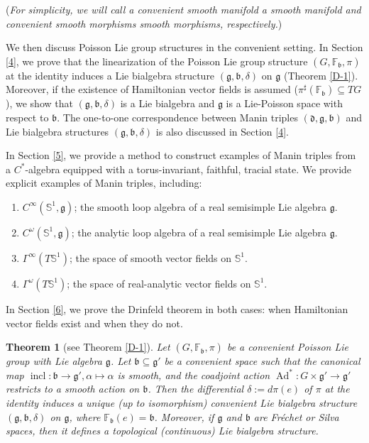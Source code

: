 \documentclass[11pt,reqno]{amsart}
\newtheorem{theorem}{Theorem}[section]
\theoremstyle{definition}
\numberwithin{equation}{section}
\begin{document}
(\textit{For simplicity, we will call a convenient smooth manifold a smooth manifold and convenient smooth morphisms smooth morphisms, respectively.})

We then discuss Poisson Lie group structures in the convenient setting. In Section \ref{4}, we prove that the linearization of the Poisson Lie group structure $(G, \mathbb{F}_{\mathfrak{b}}, \pi)$ at the identity induces a Lie bialgebra structure $(\mathfrak{g}, \mathfrak{b}, \delta)$ on $\mathfrak{g}$ (Theorem \ref{D-1}). Moreover, if the existence of Hamiltonian vector fields is assumed ($\pi^{\sharp}(\mathbb{F}_{\mathfrak{b}}) \subseteq TG$), we show that $(\mathfrak{g}, \mathfrak{b}, \delta)$ is a Lie bialgebra and $\mathfrak{g}$ is a Lie-Poisson space with respect to $\mathfrak{b}$. The one-to-one correspondence between Manin triples $(\mathfrak{d}, \mathfrak{g}, \mathfrak{b})$ and Lie bialgebra structures $(\mathfrak{g}, \mathfrak{b}, \delta)$ is also discussed in Section \ref{4}. 

In Section \ref{5}, we provide a method to construct examples of Manin triples from a $C^{*}$-algebra equipped with a torus-invariant, faithful, tracial state. We provide explicit examples of Manin triples, including:
\begin{enumerate}
    \item $C^{\infty}(\mathbb{S}^{1}, \mathfrak{g})$; the smooth loop algebra of a real semisimple Lie algebra $\mathfrak{g}$.
    \item $C^{\omega}(\mathbb{S}^{1}, \mathfrak{g})$; the analytic loop algebra of a real semisimple Lie algebra $\mathfrak{g}$.
    \item $\Gamma^{\infty}(T\mathbb{S}^{1})$; the space of smooth vector fields on $\mathbb{S}^{1}$.
    \item $\Gamma^{\omega}(T\mathbb{S}^{1})$; the space of real-analytic vector fields on $\mathbb{S}^{1}$.
\end{enumerate}

In Section \ref{6}, we prove the Drinfeld theorem in both cases: when Hamiltonian vector fields exist and when they do not.

\begin{theorem}[see Theorem \ref{D-1}]
    Let $(G, \mathbb{F}_{\mathfrak{b}}, \pi)$ be a convenient Poisson Lie group with Lie algebra $\mathfrak{g}$. Let $\mathfrak{b} \subseteq \mathfrak{g}'$ be a convenient space such that the canonical map $\operatorname{incl}: \mathfrak{b} \to \mathfrak{g}', \alpha \mapsto \alpha$ is smooth, and the coadjoint action $\operatorname{Ad}^*: G \times \mathfrak{g}' \to \mathfrak{g}'$ restricts to a smooth action on $\mathfrak{b}$. Then the differential $\delta := d\pi(e)$ of $\pi$ at the identity induces a unique (up to isomorphism) convenient Lie bialgebra structure $(\mathfrak{g}, \mathfrak{b}, \delta)$ on $\mathfrak{g}$, where $\mathbb{F}_{\mathfrak{b}}(e) = \mathfrak{b}$. Moreover, if $\mathfrak{g}$ and $\mathfrak{b}$ are Fréchet or Silva spaces, then it defines a topological (continuous) Lie bialgebra structure.
\end{theorem}
\end{document}
